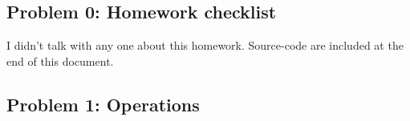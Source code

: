 \documentclass{article}
\begin{document}
 



\hypertarget{problem_0_homework_checklist_2}{}\subsection*{{Problem 0: Homework checklist}}\label{problem_0_homework_checklist_2}

\checkmark	I didn't talk with any one about this homework. \newline
\checkmark 	Source-code are included at the end of this document. 


\hypertarget{problem_1_operations_3}{}\subsection*{{Problem 1: Operations}}\label{problem_1_operations_3}
\end{document}
